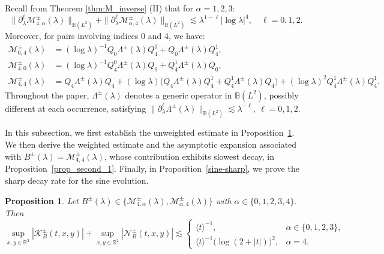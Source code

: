 \documentclass[reqno]{amsart}
\newtheorem{proposition}[theorem]{Proposition}
\numberwithin{equation}{section}
\begin{document}
Recall from Theorem \ref{thm:M_inverse} (II) that for $\alpha = 1,2,3$:  
\[
	\|\partial_\lambda^\ell \mathcal{M}_{4,\alpha}^\pm(\lambda)\|_{\mathbb{B}(L^2)} + \|\partial_\lambda^\ell \mathcal{M}_{\alpha,4}^\pm(\lambda)\|_{\mathbb{B}(L^2)} \lesssim \lambda^{1-\ell}|\log \lambda|^{4}, \quad \ell = 0,1,2.  
\]
Moreover, for pairs involving indices 0 and 4, we have:  
\begin{align}  
	\mathcal{M}_{0,4}^{\pm}(\lambda) &= (\log \lambda)^{-1} Q_0 \Lambda^\pm(\lambda) Q_{4}^0 + Q_0 \Lambda^\pm(\lambda) Q_{4}^1, \nonumber\\  
	\mathcal{M}_{4,0}^{\pm}(\lambda) &= (\log \lambda)^{-1} Q_{4}^0 \Lambda^\pm(\lambda) Q_0 + Q_{4}^1 \Lambda^\pm(\lambda) Q_0, \nonumber\\ 
	\label{M44-1}
    	\mathcal{M}_{4,4}^{\pm}(\lambda) &= Q_{4} \Lambda^\pm(\lambda) Q_{4} + (\log\lambda)\bigl(Q_{4} \Lambda^\pm(\lambda) Q_{4}^1+Q_{4}^1 \Lambda^\pm(\lambda) Q_{4}\bigr) + (\log\lambda)^2 Q_{4}^1 \Lambda^\pm(\lambda) Q_{4}^1.
\end{align} 
Throughout the paper, $\Lambda^\pm(\lambda)$ denotes  a generic operator in $\mathbb{B}(L^2)$, possibly different at each occurrence, satisfying
$
\|\partial_\lambda^\ell \Lambda^\pm(\lambda)\|_{\mathbb{B}(L^2)} \lesssim \lambda^{-\ell}, \  \ell=0,1,2.
$

In this subsection, we first establish the unweighted estimate in
Proposition~\ref{prop_second_2_3}. We then derive the weighted estimate and  the asymptotic
expansion associated with 
\(B^\pm(\lambda)=\mathcal M_{4,4}^\pm(\lambda)\), whose contribution exhibits 
slowest decay, in Proposition~\ref{prop_second_1}. Finally, in
Proposition~\ref{sine-sharp}, we prove the sharp decay rate for the
sine evolution.

\begin{proposition}\label{prop_second_2_3}
	Let $B^\pm(\lambda) \in \{\mathcal{M}_{4,\alpha}^{\pm}(\lambda), \mathcal{M}_{\alpha,4}^{\pm}(\lambda)\}$ with $\alpha \in \{0,1,2,3,4\}$. Then
	\[  
\sup _{x, y \in \mathbb{R}^2}\left| \mathcal{K}_{B}^\pm(t,x,y)\right| + \sup _{x, y \in \mathbb{R}^2}\left|\mathcal{N}_{B}^\pm (t,x,y)\right| \lesssim
	\begin{cases}
	\langle t\rangle^{-1}, & \alpha\in\{0,1,2,3\},\\
	\langle t\rangle^{-1}\bigl(\log(2+|t|)\bigr)^2, & {\alpha} = 4.
\end{cases}  
	\]  
\end{proposition}
\end{document}

